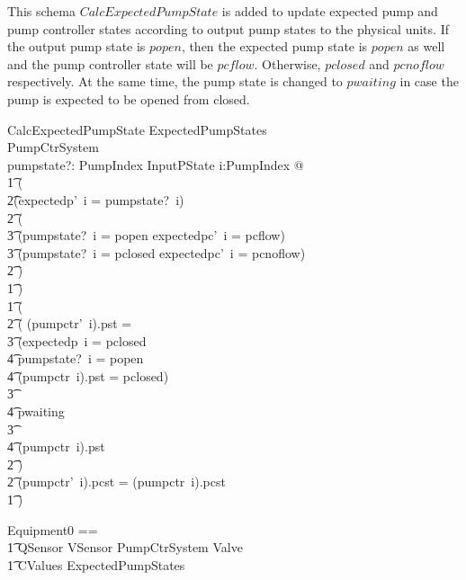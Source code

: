 \documentclass{report} %
\begin{document}
This schema $CalcExpectedPumpState$ is added to update expected pump and pump controller states according to output pump states to the physical units. If the output pump state is $popen$, then the expected pump state is $popen$ as well and the pump controller state will be $pcflow$. Otherwise, $pclosed$ and $pcnoflow$ respectively. At the same time, the pump state is changed to $pwaiting$ in case the pump is expected to be opened from closed.
\begin{schema}{CalcExpectedPumpState}
    \Delta ExpectedPumpStates \\
    \Delta PumpCtrSystem \\
    pumpstate?: PumpIndex \fun InputPState
    \where
    \forall i:PumpIndex @ \\
        \t1 ( \\
            \t2(expectedp'~i = pumpstate?~i) \land \\
            \t2 ( \\
            \t3 (pumpstate?~i = popen \land expectedpc'~i = pcflow) \lor \\
            \t3 (pumpstate?~i = pclosed \land expectedpc'~i = pcnoflow)\\
            \t2 ) \\
        \t1 ) \land \\
        \t1 ( \\
            \t2 ( (pumpctr'~i).pst = \\
                \t3 \IF (expectedp~i = pclosed \land \\
                \t4 pumpstate?~i = popen \land \\
                \t4 (pumpctr~i).pst = pclosed) \\
                \t3 \THEN \\
                \t4 pwaiting \\
                \t3 \ELSE  \\
                \t4 (pumpctr~i).pst \\
            \t2 ) \land \\
            \t2 (pumpctr'~i).pcst = (pumpctr~i).pcst \\
        \t1 )
\end{schema}

\begin{zed}
  Equipment0 ==
  \\ %
  \t1
    QSensor \land VSensor \land PumpCtrSystem \land Valve \land \\ %
  \t1  CValues \land ExpectedPumpStates
\end{zed}
\end{document}
